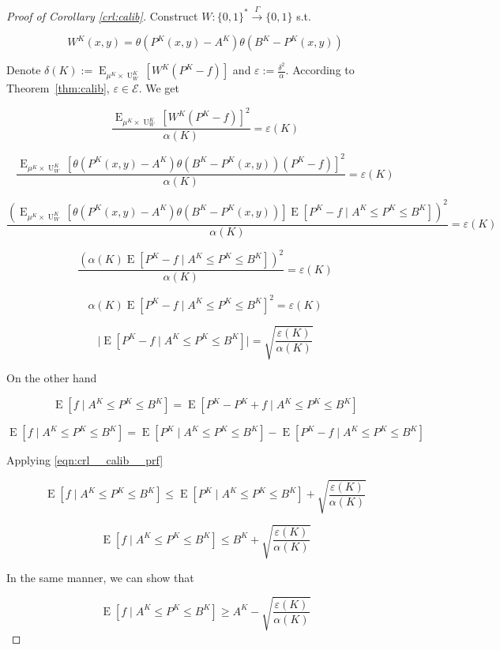 \documentclass{article}
\numberwithin{equation}{section}
\theoremstyle{definition}
\theoremstyle{plain}
\newcommand{\Bool}{\{0,1\}}
\newcommand{\Words}{{\Bool^*}}
\DeclareMathOperator{\E}{E}
\DeclareMathOperator{\Un}{U}
\newcommand{\Abs}[1]{\lvert #1 \rvert}
\newcommand{\Fall}{\mathcal{E}}
\newcommand{\Scheme}{\xrightarrow{\Gamma}}
\begin{document}
\begin{proof}[Proof of Corollary \ref{crl:calib}]

Construct $W: \Words \Scheme \Bool$ s.t. 

\[W^{K}(x,y)=\theta(P^{K}(x,y)-A^{K})\theta(B^{K}-P^{K}(x,y))\] 

Denote $\delta(K):=\E_{\mu^{K} \times \Un_W^{K}}[W^{K}(P^{K}-f)]$ and $\varepsilon:=\frac{\delta^2}{\alpha}$. According to Theorem~\ref{thm:calib}, $\varepsilon \in \Fall$.
We get

$$\frac{\E_{\mu^{K} \times \Un_W^{K}}[W^{K}(P^{K}-f)]^2}{\alpha(K)} = \varepsilon(K)$$

$$\frac{\E_{\mu^{K} \times \Un_W^{K}}[\theta(P^{K}(x,y)-A^{K})\theta(B^{K}-P^{K}(x,y))(P^{K}-f)]^2}{\alpha(K)} = \varepsilon(K)$$

$$\frac{(\E_{\mu^{K} \times \Un_W^{K}}[\theta(P^{K}(x,y)-A^{K})\theta(B^{K}-P^{K}(x,y))]\E[P^{K}-f \mid A^{K} \leq P^{K} \leq B^{K}])^2}{\alpha(K)} = \varepsilon(K)$$

$$\frac{(\alpha(K)\E[P^{K}-f \mid A^{K} \leq P^{K} \leq B^{K}])^2}{\alpha(K)} = \varepsilon(K)$$

$$\alpha(K)\E[P^{K}-f \mid A^{K} \leq P^{K} \leq B^{K}]^2 = \varepsilon(K)$$

\begin{equation}
\label{eqn:crl__calib__prf}
\Abs{\E[P^{K}-f \mid A^{K} \leq P^{K} \leq B^{K}]} = \sqrt{\frac{\varepsilon(K)}{\alpha(K)}}
\end{equation}

On the other hand

$$\E[f \mid A^{K} \leq P^{K} \leq B^{K}] = \E[P^{K}-P^{K}+f \mid A^{K} \leq P^{K} \leq B^{K}]$$

$$\E[f \mid A^{K} \leq P^{K} \leq B^{K}] = \E[P^{K} \mid A^{K} \leq P^{K} \leq B^{K}]-\E[P^{K}-f \mid A^{K} \leq P^{K} \leq B^{K}]$$

Applying \ref{eqn:crl__calib__prf}

$$\E[f \mid A^{K} \leq P^{K} \leq B^{K}] \leq \E[P^{K} \mid A^{K} \leq P^{K} \leq B^{K}]+\sqrt{\frac{\varepsilon(K)}{\alpha(K)}}$$


$$\E[f \mid A^{K} \leq P^{K} \leq B^{K}] \leq B^{K} + \sqrt{\frac{\varepsilon(K)}{\alpha(K)}}$$

In the same manner, we can show that

$$\E[f \mid A^{K} \leq P^{K} \leq B^{K}] \geq A^{K} - \sqrt{\frac{\varepsilon(K)}{\alpha(K)}}$$
\end{proof}
\end{document}
